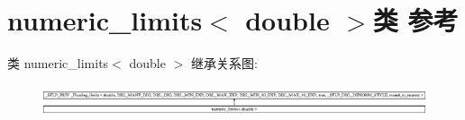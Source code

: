 \hypertarget{classnumeric__limits_3_01double_01_4}{}\section{numeric\+\_\+limits$<$ double $>$类 参考}
\label{classnumeric__limits_3_01double_01_4}
类 numeric\+\_\+limits$<$ double $>$ 继承关系图\+:\begin{figure}[H]
\begin{center}
\leavevmode
\includegraphics[height=0.958904cm]{classnumeric__limits_3_01double_01_4}
\end{center}
\end{figure}
